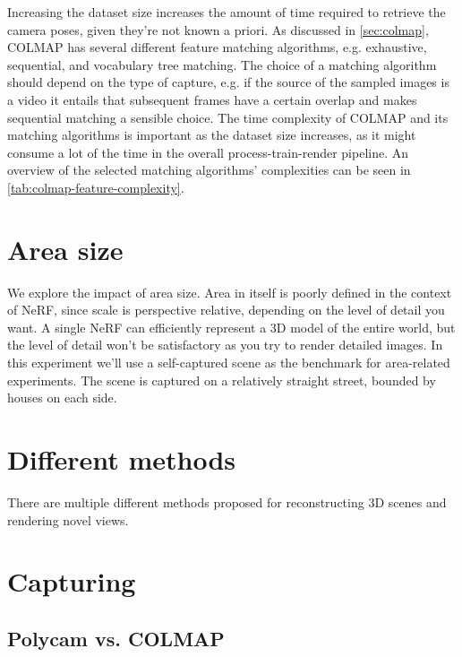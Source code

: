 

Increasing the dataset size increases the amount of time required to retrieve the camera poses, given they're not known a priori. As discussed in \autoref{sec:colmap}, COLMAP has several different feature matching algorithms, e.g. exhaustive, sequential, and vocabulary tree matching. The choice of a matching algorithm should depend on the type of capture, e.g. if the source of the sampled images is a video it entails that subsequent frames have a certain overlap and makes sequential matching a sensible choice. The time complexity of COLMAP and its matching algorithms is important as the dataset size increases, as it might consume a lot of the time in the overall process-train-render pipeline. An overview of the selected matching algorithms' complexities can be seen in \autoref{tab:colmap-feature-complexity}.

\section{Area size}
We explore the impact of area size. Area in itself is poorly defined in the context of NeRF, since scale is perspective relative, depending on the level of detail you want. A single NeRF can efficiently represent a 3D model of the entire world, but the level of detail won't be satisfactory as you try to render detailed images. In this experiment we'll use a self-captured scene as the benchmark for area-related experiments. The scene \cite{data:streetview} is captured on a relatively straight street, bounded by houses on each side. 



\section{Different methods}
There are multiple different methods proposed for reconstructing 3D scenes and rendering novel views.






\section{Capturing}
\subsection{Polycam vs. COLMAP}



